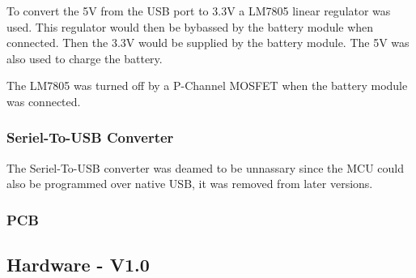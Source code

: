         To convert the 5V from the USB port to 3.3V a LM7805 linear regulator was used. This regulator
        would then be bybassed by the battery module when connected. Then the 3.3V would be supplied by the
        battery module. The 5V was also used to charge the battery.

        The LM7805 was turned off by a P-Channel MOSFET when the battery module was connected.

    \subsubsection{Seriel-To-USB Converter}
        The Seriel-To-USB converter was deamed to be unnassary since the MCU could also be programmed 
        over native USB, it was removed from later versions.

    \subsubsection{PCB}

\subsection{Hardware - V1.0}